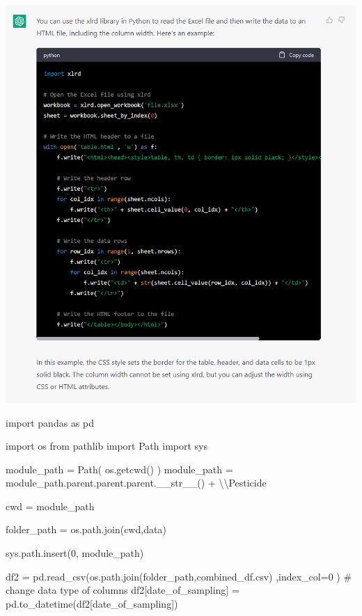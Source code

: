 \documentclass[
  letterpaper,
  DIV=11,
  numbers=noendperiod]{scrartcl}
\newenvironment{Shaded}{\begin{snugshade}}{\end{snugshade}}
\newcommand{\CharTok}[1]{\textcolor[rgb]{0.13,0.47,0.30}{#1}}
\newcommand{\CommentTok}[1]{\textcolor[rgb]{0.37,0.37,0.37}{#1}}
\newcommand{\DecValTok}[1]{\textcolor[rgb]{0.68,0.00,0.00}{#1}}
\newcommand{\FunctionTok}[1]{\textcolor[rgb]{0.28,0.35,0.67}{#1}}
\newcommand{\ImportTok}[1]{\textcolor[rgb]{0.00,0.46,0.62}{#1}}
\newcommand{\NormalTok}[1]{\textcolor[rgb]{0.00,0.23,0.31}{#1}}
\newcommand{\OperatorTok}[1]{\textcolor[rgb]{0.37,0.37,0.37}{#1}}
\newcommand{\StringTok}[1]{\textcolor[rgb]{0.13,0.47,0.30}{#1}}
\begin{document}
\includegraphics{ghtop_images/chatgpt_2.png}

\begin{Shaded}
\begin{Highlighting}[]
\ImportTok{import}\NormalTok{ pandas }\ImportTok{as}\NormalTok{ pd}

\ImportTok{import}\NormalTok{ os}
\ImportTok{from}\NormalTok{ pathlib }\ImportTok{import}\NormalTok{ Path}
\ImportTok{import}\NormalTok{ sys}

\NormalTok{module\_path }\OperatorTok{=}\NormalTok{ Path( os.getcwd() )}
\NormalTok{module\_path }\OperatorTok{=}\NormalTok{ module\_path.parent.parent.parent.}\FunctionTok{\_\_str\_\_}\NormalTok{() }\OperatorTok{+} \StringTok{\textquotesingle{}}\CharTok{\textbackslash{}\textbackslash{}}\StringTok{Pesticide\textquotesingle{}}

\NormalTok{cwd }\OperatorTok{=}\NormalTok{ module\_path}

\NormalTok{folder\_path }\OperatorTok{=}\NormalTok{ os.path.join(cwd,}\StringTok{\textquotesingle{}data\textquotesingle{}}\NormalTok{)}

\NormalTok{sys.path.insert(}\DecValTok{0}\NormalTok{, module\_path)}

\NormalTok{df2 }\OperatorTok{=}\NormalTok{ pd.read\_csv(os.path.join(folder\_path,}\StringTok{\textquotesingle{}combined\_df.csv\textquotesingle{}}\NormalTok{) ,index\_col}\OperatorTok{=}\DecValTok{0}\NormalTok{ )}
\CommentTok{\# change data type of columns}
\NormalTok{df2[}\StringTok{\textquotesingle{}date\_of\_sampling\textquotesingle{}}\NormalTok{] }\OperatorTok{=}\NormalTok{ pd.to\_datetime(df2[}\StringTok{\textquotesingle{}date\_of\_sampling\textquotesingle{}}\NormalTok{])}
\end{Highlighting}
\end{Shaded}
\end{document}
